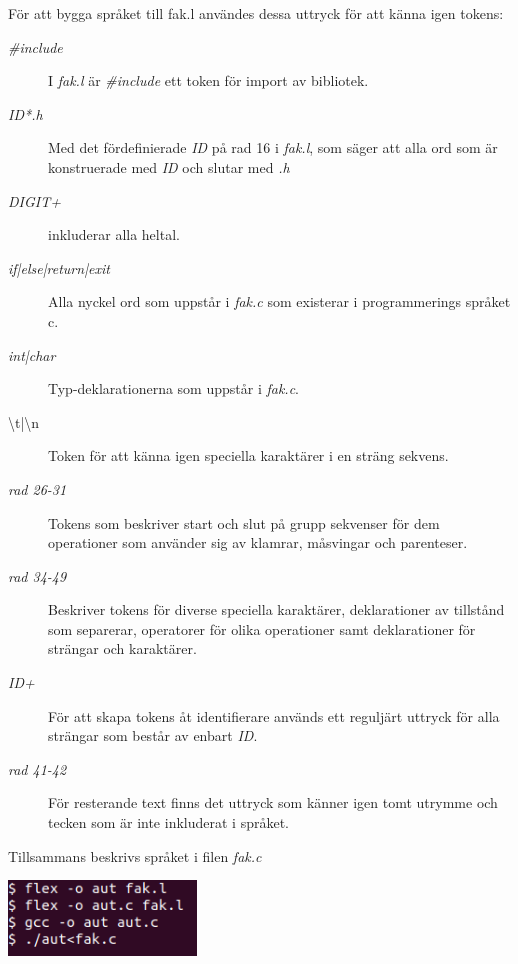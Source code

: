 För att bygga språket till fak.l användes dessa uttryck för att känna igen tokens:
\begin{description}

\item[\textit{\#include}] I \textit{fak.l} är \textit{\#include} ett token för import av bibliotek. 

\item[\textit{{ID}*.h}] Med det fördefinierade \textit{ID} på rad 16 i
\textit{fak.l}, som säger att alla ord som är konstruerade med \textit{ID} och slutar
med \textit{.h}

\item[\textit{{DIGIT}+}] inkluderar alla heltal.

\item[\textit{if|else|return|exit}] Alla nyckel ord som uppstår i \textit{fak.c }
som existerar i programmerings språket c.

\item[\textit{int|char}] Typ-deklarationerna som uppstår i \textit{fak.c}. 

\item[\textbackslash t|\textbackslash n] Token för att känna igen speciella karaktärer i en sträng sekvens.

\item[\textit{rad 26-31}] Tokens som beskriver start och slut på grupp sekvenser för dem
operationer som använder sig av klamrar, måsvingar och parenteser.

\item[\textit{rad 34-49}] Beskriver tokens för diverse speciella karaktärer, deklarationer av
tillstånd som separerar, operatorer för olika operationer samt deklarationer för strängar och
karaktärer.

\item[\textit{{ID}+}] För att skapa tokens åt identifierare används ett reguljärt uttryck för alla strängar som
består av enbart \textit{ID}.

\item[\textit{rad 41-42}] För resterande text finns det uttryck som känner igen tomt utrymme och
tecken som är inte inkluderat i språket.

\end{description}

 Tillsammans beskrivs språket i filen \textit{fak.c}


\begin{center}
    \includegraphics[height=2cm]{bilder/flex_command.png}
    \label{fig:flex}
\end{center}

